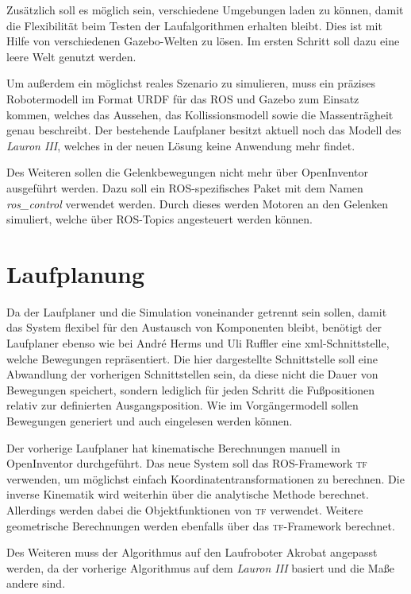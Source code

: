 Zusätzlich soll es möglich sein, verschiedene Umgebungen laden zu können, damit die Flexibilität beim Testen der Laufalgorithmen erhalten bleibt. Dies ist mit Hilfe von verschiedenen Gazebo-Welten zu lösen. Im ersten Schritt soll dazu eine leere Welt genutzt werden.

Um außerdem ein möglichst reales Szenario zu simulieren, muss ein präzises Robotermodell im Format \ac{URDF} für das \ac{ROS} und Gazebo zum Einsatz kommen, welches das Aussehen, das Kollissionsmodell sowie die Massenträgheit genau beschreibt. Der bestehende Laufplaner besitzt aktuell noch das Modell des \emph{Lauron III}, welches in der neuen Lösung keine Anwendung mehr findet.

Des Weiteren sollen die Gelenkbewegungen nicht mehr über OpenInventor \autocite{inventor} ausgeführt werden. Dazu soll ein \ac{ROS}-spezifisches Paket mit dem Namen \emph{ros\_control} verwendet werden. Durch dieses werden Motoren an den Gelenken simuliert, welche über \ac{ROS}-Topics angesteuert werden können.

\section{Laufplanung}

Da der Laufplaner und die Simulation voneinander getrennt sein sollen, damit das System flexibel für den Austausch von Komponenten bleibt, benötigt der Laufplaner ebenso wie bei André Herms und Uli Ruffler eine xml-Schnittstelle, welche Bewegungen repräsentiert. Die hier dargestellte Schnittstelle soll eine Abwandlung der vorherigen Schnittstellen sein, da diese nicht die Dauer von Bewegungen speichert, sondern lediglich für jeden Schritt die Fußpositionen relativ zur definierten Ausgangsposition. Wie im Vorgängermodell sollen Bewegungen generiert und auch eingelesen werden können.

Der vorherige Laufplaner hat kinematische Berechnungen manuell in OpenInventor durchgeführt. Das neue System soll das \ac{ROS}-Framework \textsc{tf} verwenden, um möglichst einfach Koordinatentransformationen zu berechnen. Die inverse Kinematik wird weiterhin über die analytische Methode berechnet. Allerdings werden dabei die Objektfunktionen von \textsc{tf} verwendet. Weitere geometrische Berechnungen werden ebenfalls über das \textsc{tf}-Framework berechnet.

Des Weiteren muss der Algorithmus auf den Laufroboter Akrobat angepasst werden, da der vorherige Algorithmus auf dem \emph{Lauron III} basiert und die Maße andere sind.